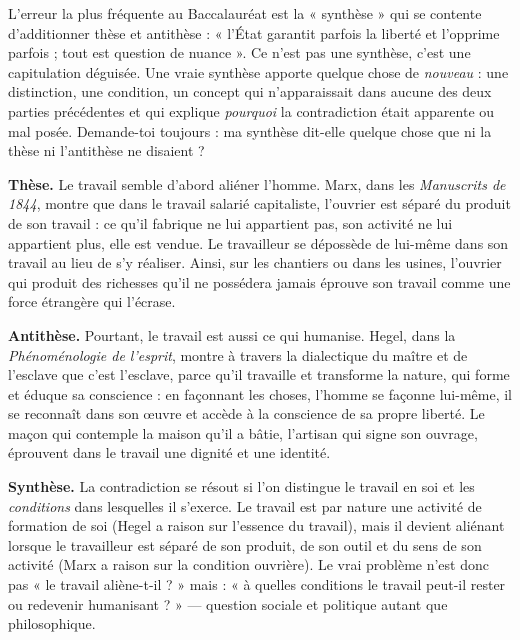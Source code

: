 \documentclass[11pt]{article}
\begin{document}
\begin{attention}
L'erreur la plus fréquente au Baccalauréat est la « synthèse » qui se contente d'additionner thèse et antithèse : « l'État garantit parfois la liberté et l'opprime parfois ; tout est question de nuance ». Ce n'est pas une synthèse, c'est une capitulation déguisée. Une vraie synthèse apporte quelque chose de \emph{nouveau} : une distinction, une condition, un concept qui n'apparaissait dans aucune des deux parties précédentes et qui explique \emph{pourquoi} la contradiction était apparente ou mal posée. Demande-toi toujours : ma synthèse dit-elle quelque chose que ni la thèse ni l'antithèse ne disaient ?
\end{attention}

\begin{exemplebox}
\textbf{Thèse.} Le travail semble d'abord aliéner l'homme. Marx, dans les \emph{Manuscrits de 1844}, montre que dans le travail salarié capitaliste, l'ouvrier est séparé du produit de son travail : ce qu'il fabrique ne lui appartient pas, son activité ne lui appartient plus, elle est vendue. Le travailleur se dépossède de lui-même dans son travail au lieu de s'y réaliser. Ainsi, sur les chantiers ou dans les usines, l'ouvrier qui produit des richesses qu'il ne possédera jamais éprouve son travail comme une force étrangère qui l'écrase.

\textbf{Antithèse.} Pourtant, le travail est aussi ce qui humanise. Hegel, dans la \emph{Phénoménologie de l'esprit}, montre à travers la dialectique du maître et de l'esclave que c'est l'esclave, parce qu'il travaille et transforme la nature, qui forme et éduque sa conscience : en façonnant les choses, l'homme se façonne lui-même, il se reconnaît dans son œuvre et accède à la conscience de sa propre liberté. Le maçon qui contemple la maison qu'il a bâtie, l'artisan qui signe son ouvrage, éprouvent dans le travail une dignité et une identité.

\textbf{Synthèse.} La contradiction se résout si l'on distingue le travail en soi et les \emph{conditions} dans lesquelles il s'exerce. Le travail est par nature une activité de formation de soi (Hegel a raison sur l'essence du travail), mais il devient aliénant lorsque le travailleur est séparé de son produit, de son outil et du sens de son activité (Marx a raison sur la condition ouvrière). Le vrai problème n'est donc pas « le travail aliène-t-il ? » mais : « à quelles conditions le travail peut-il rester ou redevenir humanisant ? » — question sociale et politique autant que philosophique.
\end{exemplebox}
\end{document}
